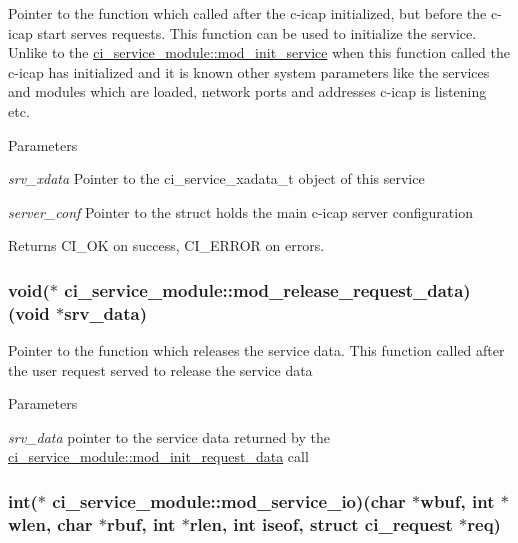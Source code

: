 Pointer to the function which called after the c-\/icap initialized, but before the c-\/icap start serves requests. This function can be used to initialize the service. Unlike to the \hyperlink{structci__service__module_acf9f56283f9418715be2f87967928876}{ci\_\-service\_\-module::mod\_\-init\_\-service} when this function called the c-\/icap has initialized and it is known other system parameters like the services and modules which are loaded, network ports and addresses c-\/icap is listening etc. 
\begin{DoxyParams}{Parameters}
\item[{\em srv\_\-xdata}]Pointer to the ci\_\-service\_\-xadata\_\-t object of this service \item[{\em server\_\-conf}]Pointer to the struct holds the main c-\/icap server configuration \end{DoxyParams}
\begin{DoxyReturn}{Returns}
CI\_\-OK on success, CI\_\-ERROR on errors. 
\end{DoxyReturn}
\hypertarget{structci__service__module_ae809353c47dbfe742be12fe78d716373}{
\subsubsection[{mod\_\-release\_\-request\_\-data}]{\setlength{\rightskip}{0pt plus 5cm}void($\ast$ {\bf ci\_\-service\_\-module::mod\_\-release\_\-request\_\-data})(void $\ast$srv\_\-data)}}
\label{structci__service__module_ae809353c47dbfe742be12fe78d716373}


Pointer to the function which releases the service data. This function called after the user request served to release the service data 
\begin{DoxyParams}{Parameters}
\item[{\em srv\_\-data}]pointer to the service data returned by the \hyperlink{structci__service__module_a0ab686479bbf157f12c5913efd396c96}{ci\_\-service\_\-module::mod\_\-init\_\-request\_\-data} call \end{DoxyParams}
\hypertarget{structci__service__module_ac79b8c4bd560ee1f5cb21ca604c90978}{
\subsubsection[{mod\_\-service\_\-io}]{\setlength{\rightskip}{0pt plus 5cm}int($\ast$ {\bf ci\_\-service\_\-module::mod\_\-service\_\-io})(char $\ast$wbuf, int $\ast$wlen, char $\ast$rbuf, int $\ast$rlen, int iseof, struct ci\_\-request $\ast$req)}}
\label{structci__service__module_ac79b8c4bd560ee1f5cb21ca604c90978}


